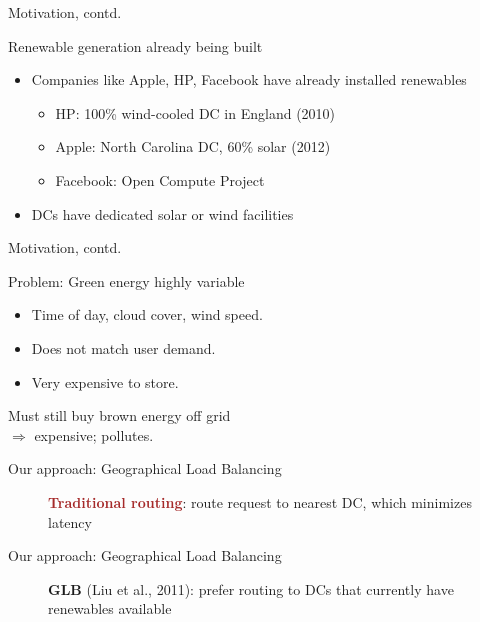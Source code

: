 \documentclass[xcolor=dvipsnames]{beamer}
\begin{document}
\begin{frame}{Motivation, contd.}
	\begin{block}{Renewable generation already being built}
		\begin{itemize}
			\item Companies like Apple, HP, Facebook have already installed renewables
			\begin{itemize}
				\item HP: 100\% wind-cooled DC in England (2010)
				\item Apple: North Carolina DC, 60\% solar (2012)
				\item Facebook: Open Compute Project
			\end{itemize}
			\item DCs have dedicated solar or wind facilities
		\end{itemize}
	\end{block}
\end{frame}

\begin{frame}{Motivation, contd.}

	\begin{block}{Problem: Green energy highly variable} 
		\begin{itemize}
			 \item{Time of day, cloud cover, wind speed.}
			 \item{Does not match user demand. }
			\item{Very expensive to store.}
		\end{itemize}
		Must still buy brown energy off grid \\ $\Rightarrow$ expensive; pollutes.
	\end{block}
\end{frame}

\begin{frame}{Our approach: Geographical Load Balancing}
	\begin{figure}
		\caption{\textbf{\textcolor{brown}{Traditional routing}}: route request to nearest DC, which minimizes latency}
		\centering
	\end{figure}
\end{frame}
\begin{frame}{Our approach: Geographical Load Balancing}
	\begin{figure}
		\caption{\textbf{\textcolor{dgreen}{GLB}} (Liu et al., 2011): prefer routing to DCs that currently have renewables available}
		\centering
	\end{figure}
\end{frame}
\end{document}
